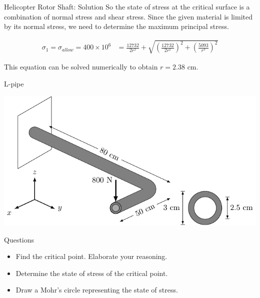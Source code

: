 \documentclass[10pt, svgnames]{beamer}
\begin{document}
\begin{frame}[label={sec:orge241a84}]{Helicopter Rotor Shaft: Solution}
So the state of stress at the critical surface is a combination of normal stress and shear stress. Since the given material is limited by its normal stress, we need to determine the maximum principal stress.

\begin{align*}
\sigma_1 = \sigma_{allow} = 400 \times 10^6 &= \frac{12732}{2r^2} + \sqrt{ \left( \frac{12732}{2r^2} \right)^2 + \left( \frac{5093}{r^3} \right)^2 }
\end{align*}

This equation can be solved numerically to obtain \(r = 2.38\) cm.
\end{frame}

\begin{frame}[label={sec:org089a716}]{L-pipe}
\begin{center}
\includegraphics[width=.9\linewidth]{pictures/l-pipe.pdf}
\end{center}
\end{frame}

\begin{frame}[label={sec:orgf62b71a}]{Questions}
\begin{itemize}
\item Find the critical point. Elaborate your reasoning.
\item Determine the state of stress of the critical point.
\item Draw a Mohr's circle representing the state of stress.
\end{itemize}
\end{frame}
\end{document}
